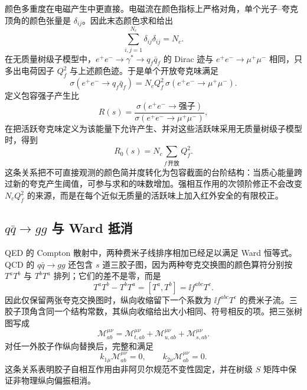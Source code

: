 颜色多重度在电磁产生中更直接。电磁流在颜色指标上严格对角，单个光子--夸克顶角的颜色张量是 $\delta_{ij}$。因此末态颜色求和给出
\begin{equation*}
 \sum_{i,j=1}^{N_c}\delta_{ij}\delta_{ij}=N_c.
\end{equation*}
在无质量树级子模型中，$e^+e^-\to\gamma^*\to q_f\bar q_f$ 的 Dirac 迹与 $e^+e^-\to\mu^+\mu^-$ 相同，只多出电荷因子 $Q_f^2$ 与上述颜色迹。于是单个开放夸克味满足
\begin{equation}
\boxed{
 \sigma(e^+e^-\to q_f\bar q_f)
 =N_cQ_f^2\,\sigma(e^+e^-\to\mu^+\mu^-).}
\label{eq:R-ratio-single-flavor-dp68}
\end{equation}
定义包容强子产生比
\begin{equation*}
 R(s)
 =\frac{\sigma(e^+e^-\to\text{强子})}
 {\sigma(e^+e^-\to\mu^+\mu^-)},
\end{equation*}
在把活跃夸克味定义为该能量下允许产生、并对这些活跃味采用无质量树级子模型时，得到
\begin{equation}
 \boxed{
 R_0(s)=N_c\sum_{f\,\text{开放}}Q_f^2.}
 \label{eq:R-ratio-tree-dp10}
\end{equation}
这条关系把不可直接观测的颜色简并度转化为包容截面的台阶结构：当质心能量跨过新的夸克产生阈值，可参与求和的味数增加。强相互作用的次领阶修正不会改变 $N_cQ_f^2$ 的来源，而是在每个近似无质量的活跃味上加入红外安全的有限校正。

\subsection{$q\bar q\to gg$ 与 Ward 抵消}

QED 的 Compton 散射中，两种费米子线排序相加已经足以满足 Ward 恒等式。QCD 的 $q\bar q\to gg$ 还包含 $s$ 道三胶子图，因为两种夸克交换图的颜色算符分别按 $T^aT^b$ 与 $T^bT^a$ 排列；它们的差不是零，而是
\begin{equation*}
 T^aT^b-T^bT^a
 =[T^a,T^b]
 =\ii f^{abc}T^c.
\end{equation*}
因此仅保留两张夸克交换图时，纵向收缩留下一个系数为 $\ii f^{abc}T^c$ 的费米子流。三胶子顶角含同一个结构常数，其纵向收缩给出大小相同、符号相反的项。把三张树图写成
\begin{equation}
\boxed{
 \mathcal M_{ab}^{\mu\nu}
 =\mathcal M_{t,ab}^{\mu\nu}
 +\mathcal M_{u,ab}^{\mu\nu}
 +\mathcal M_{s,ab}^{\mu\nu}.}
\label{eq:qcd-qqbar-gg-amplitude-sum-dp68}
\end{equation}
对任一外胶子作纵向替换后，完整和满足
\begin{equation}
 \boxed{
 k_{1\mu}\mathcal M^{\mu\nu}_{ab}=0,
 \qquad
 k_{2\nu}\mathcal M^{\mu\nu}_{ab}=0.}
 \label{eq:qcd-qqbar-gg-ward-dp32}
\end{equation}
这条关系表明胶子自相互作用由非阿贝尔规范不变性固定，并在树级 $S$ 矩阵中保证非物理纵向偏振相消。

